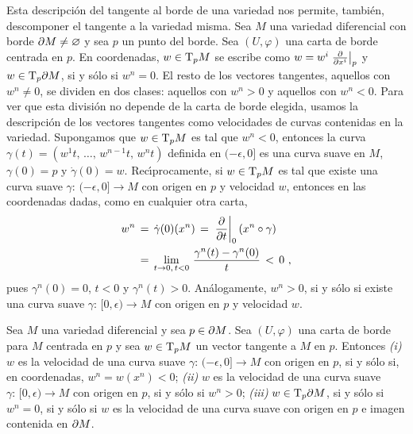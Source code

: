 Esta descripci\'{o}n del tangente al borde de una variedad nos permite,
tambi\'{e}n, descomponer el tangente a la variedad misma. Sea $M$ una
variedad diferencial con borde $\borde[M]\not=\varnothing$ y sea $p$
un punto del borde. Sea $(U,\varphi)$ una carta de borde centrada en $p$.
En coordenadas, $w\in\tangente[p]{M}$ se escribe como
$w=w^{i}\gancho[p]{x^{i}}$ y $w\in\tangente[p]{\borde[M]}$, si y s\'{o}lo
si $w^{n}=0$. El resto de los vectores tangentes, aquellos con
$w^{n}\not =0$, se dividen en dos clases: aquellos con $w^{n}>0$ y
aquellos con $w^{n}<0$. Para ver que esta divisi\'{o}n no depende de la
carta de borde elegida, usamos la descripci\'{o}n de los vectores
tangentes como velocidades de curvas contenidas en la variedad. Supongamos
que $w\in\tangente[p]{M}$ es tal que $w^{n}<0$, entonces la curva
$\gamma(t)=(w^{1}t,\,\dots,\,w^{n-1}t,\,w^{n}t)$ definida en $(-\epsilon,0]$
es una curva suave en $M$, $\gamma(0)=p$ y $\dot{\gamma}(0)=w$.
Rec\'{\i}procamente, si $w\in\tangente[p]{M}$ es tal que existe una
curva suave $\gamma:\,(-\epsilon,0]\rightarrow M$ con origen en $p$ y
velocidad $w$, entonces en las coordenadas dadas, como en cualquier otra
carta,
\begin{align*}
	w^{n} & \,=\,\dot{\gamma}(0)(x^{n}) \,=\,
		\gancho[0]{t}(x^{n}\circ\gamma) \\
	& \,=\,\lim_{t\to0,\,t<0}\,\frac{\gamma^{n}(t)-\gamma^{n}(0)}{t}
		\,<\,0
	\text{ ,}
\end{align*}
%
pues $\gamma^{n}(0)=0$, $t<0$ y $\gamma^{n}(t)>0$. An\'{a}logamente,
$w^{n}>0$, si y s\'{o}lo si existe una curva suave
$\gamma:\,[0,\epsilon)\rightarrow M$ con origen en $p$ y velocidad $w$.

\begin{propoTangenteBordeCurvas}\label{thm:tangentebordecurvas}
	Sea $M$ una variedad diferencial y sea $p\in\borde[M]$. Sea
	$(U,\varphi)$ una carta de borde para $M$ centrada en $p$ y
	sea $w\in\tangente[p]{M}$ un vector tangente a $M$ en $p$.
	Entonces \emph{(i)} $w$ es la velocidad de una curva suave
	$\gamma:\,(-\epsilon,0]\rightarrow M$ con origen en $p$, si y
	s\'{o}lo si, en coordenadas, $w^{n}=w(x^{n})<0$; \emph{(ii)} $w$
	es la velocidad de una curva suave
	$\gamma:\,[0,\epsilon)\rightarrow M$ con origen en $p$, si y
	s\'{o}lo si $w^{n}>0$; \emph{(iii)} $w\in\tangente[p]{\borde[M]}$,
	si y s\'{o}lo si $w^{n}=0$, si y s\'{o}lo si $w$ es la velocidad
	de una curva suave con origen en $p$ e imagen contenida en
	$\borde[M]$.
\end{propoTangenteBordeCurvas}

